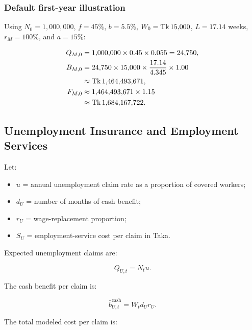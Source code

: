\subsubsection*{Default first-year illustration}
Using $N_0=1{,}000{,}000$, $f=45\%$, $b=5.5\%$, $W_0=\text{Tk}\,15{,}000$, $L=17.14$ weeks, $r_M=100\%$, and $a=15\%$:

\begin{align}
Q_{M,0} &=1{,}000{,}000\times0.45\times0.055=24{,}750,\\
B_{M,0} &=24{,}750\times15{,}000\times\frac{17.14}{4.345}\times1.00\\
&\approx\text{Tk}\,1{,}464{,}493{,}671,\\
F_{M,0} &\approx1{,}464{,}493{,}671\times1.15\\
&\approx\text{Tk}\,1{,}684{,}167{,}722.
\end{align}

\subsection{Unemployment Insurance and Employment Services}


Let:

\begin{itemize}
  \item $u$ = annual unemployment claim rate as a proportion of covered workers;
  \item $d_U$ = number of months of cash benefit;
  \item $r_U$ = wage-replacement proportion;
  \item $S_U$ = employment-service cost per claim in Taka.
\end{itemize}

Expected unemployment claims are:

\begin{equation}
Q_{U,t}=N_tu.
\end{equation}

The cash benefit per claim is:

\begin{equation}
\bar{b}^{\mathrm{cash}}_{U,t}=W_td_Ur_U.
\end{equation}

The total modeled cost per claim is:

